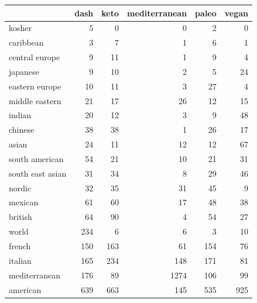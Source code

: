 \documentclass[12pt,a4paper]{article}
\begin{document}
{{            \begin{center}
                \begin{tabular}{l|rrrrr}
                \toprule
                    & dash & keto & mediterranean & paleo & vegan \\
                \midrule
                    kosher           & 5    & 0    & 0    & 2    & 0   \\
                    caribbean        & 3    & 7    & 1    & 6    & 1   \\
                    central europe   & 9    & 11   & 1    & 9    & 4   \\
                    japanese         & 9    & 10   & 2    & 5    & 24  \\
                    eastern europe   & 10   & 11   & 3    & 27   & 4   \\
                    middle eastern   & 21   & 17   & 26   & 12   & 15  \\
                    indian           & 20   & 12   & 3    & 9    & 48  \\
                    chinese          & 38   & 38   & 1    & 26   & 17  \\
                    asian            & 24   & 11   & 12   & 12   & 67  \\
                    south american   & 54   & 21   & 10   & 21   & 31  \\
                    south east asian & 31   & 34   & 8    & 29   & 46  \\
                    nordic           & 32   & 35   & 31   & 45   & 9   \\
                    mexican          & 61   & 60   & 17   & 48   & 38  \\
                    british          & 64   & 90   & 4    & 54   & 27  \\
                    world            & 234  & 6    & 6    & 3    & 10  \\
                    french           & 150  & 163  & 61   & 154  & 76  \\
                    italian          & 165  & 234  & 148  & 171  & 81  \\
                    mediterranean    & 176  & 89   & 1274 & 106  & 99  \\
                    american         & 639  & 663  & 145  & 535  & 925 \\
                \bottomrule
                \end{tabular}
            \end{center}

}}
\end{document}

